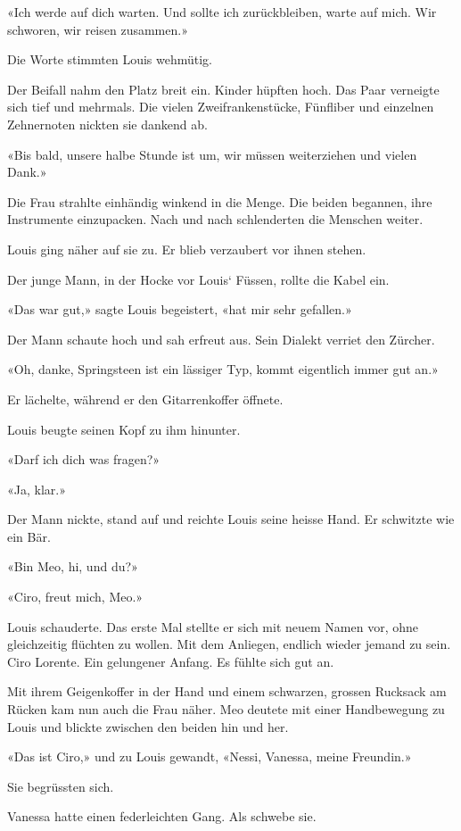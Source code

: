 «Ich werde auf dich warten. Und sollte ich zurückbleiben, warte auf
mich. Wir schworen, wir reisen zusammen.»

Die Worte stimmten Louis wehmütig.

Der Beifall nahm den Platz breit ein. Kinder hüpften hoch. Das Paar
verneigte sich tief und mehrmals. Die vielen Zweifrankenstücke,
Fünfliber und einzelnen Zehnernoten nickten sie dankend ab.

«Bis bald, unsere halbe Stunde ist um, wir müssen weiterziehen und
vielen Dank.»

Die Frau strahlte einhändig winkend in die Menge. Die beiden begannen,
ihre Instrumente einzupacken. Nach und nach schlenderten die Menschen
weiter.

Louis ging näher auf sie zu. Er blieb verzaubert vor ihnen stehen.

Der junge Mann, in der Hocke vor Louis` Füssen, rollte die Kabel ein.

«Das war gut,» sagte Louis begeistert, «hat mir sehr gefallen.»

Der Mann schaute hoch und sah erfreut aus. Sein Dialekt verriet den
Zürcher.

«Oh, danke, Springsteen ist ein lässiger Typ, kommt eigentlich immer gut
an.»

Er lächelte, während er den Gitarrenkoffer öffnete.

Louis beugte seinen Kopf zu ihm hinunter.

«Darf ich dich was fragen?»

«Ja, klar.»

Der Mann nickte, stand auf und reichte Louis seine heisse Hand. Er
schwitzte wie ein Bär.

«Bin Meo, hi, und du?»

«Ciro, freut mich, Meo.»

Louis schauderte. Das erste Mal stellte er sich mit neuem Namen vor,
ohne gleichzeitig flüchten zu wollen. Mit dem Anliegen, endlich wieder
jemand zu sein. Ciro Lorente. Ein gelungener Anfang. Es fühlte sich gut
an.

Mit ihrem Geigenkoffer in der Hand und einem schwarzen, grossen Rucksack
am Rücken kam nun auch die Frau näher. Meo deutete mit einer
Handbewegung zu Louis und blickte zwischen den beiden hin und her.

«Das ist Ciro,» und zu Louis gewandt, «Nessi, Vanessa, meine Freundin.»

Sie begrüssten sich.

Vanessa hatte einen federleichten Gang. Als schwebe sie.

